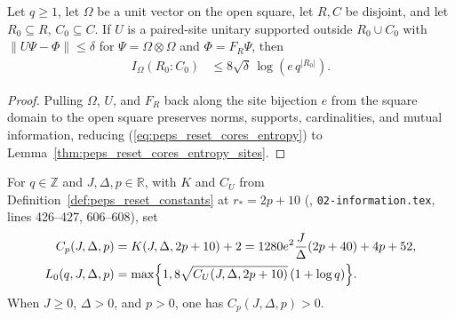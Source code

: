 \begin{lemma}
    \label{thm:peps_reset_cores_entropy}
    \leanok
    Let $q\ge1$, let $\Omega$ be a unit vector on the open square, let $R,C$ be disjoint, and let $R_0\subseteq R$, $C_0\subseteq C$. If $U$ is a paired-site unitary supported outside $R_0\cup C_0$ with $\|U\Psi-\Phi\|\le\delta$ for $\Psi=\Omega\otimes\Omega$ and $\Phi=F_R\Psi$, then
    \begin{align}
        I_\Omega(R_0:C_0) & \le8\sqrt\delta\,\log(e\,q^{|R_0|}).
        \label{eq:peps_reset_cores_entropy}
    \end{align}
\end{lemma}
\begin{proof}
    \leanok
    Pulling $\Omega$, $U$, and $F_R$ back along the site bijection $e$ from the square domain to the open square preserves norms, supports, cardinalities, and mutual information, reducing (\ref{eq:peps_reset_cores_entropy}) to Lemma~\ref{thm:peps_reset_cores_entropy_sites}.
\end{proof}

\begin{definition}
    \label{def:peps_reset_width}
    \leanok
    For $q\in\mathbb Z$ and $J,\Delta,p\in\mathbb R$, with $K$ and $C_U$ from Definition~\ref{def:peps_reset_constants} at $r_*=2p+10$ (\cite{OpenAI2026PolynomialPEPS}, \texttt{02-information.tex}, lines 426--427, 606--608), set
    \begin{align}
        C_p(J,\Delta,p)   & =K(J,\Delta,2p+10)+2
        =1280e^2\frac J\Delta(2p+40)+4p+52,
        \label{eq:peps_reset_width}                                                       \\
        L_0(q,J,\Delta,p) & =\max\Bigl\{1,8\sqrt{C_U(J,\Delta,2p+10)}\,(1+\log q)\Bigr\}.
        \notag
    \end{align}
    When $J\ge0$, $\Delta>0$, and $p>0$, one has $C_p(J,\Delta,p)>0$.
\end{definition}

